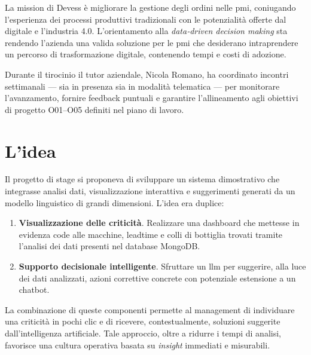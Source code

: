 La mission di Devess è migliorare la gestione degli ordini nelle \gls{pmi}, coniugando l’esperienza dei processi produttivi tradizionali con le potenzialità offerte 
dal digitale e l'industria 4.0. L’orientamento alla \textit{data‑driven decision making} sta rendendo 
l’azienda una valida soluzione per le \gls{pmi} che desiderano intraprendere un percorso di trasformazione digitale, contenendo tempi e costi di adozione.

Durante il tirocinio il tutor aziendale, Nicola Romano, ha coordinato incontri settimanali — sia in presenza sia in modalità telematica — per monitorare l’avanzamento, fornire 
feedback puntuali e garantire l’allineamento agli obiettivi di progetto O01–O05 definiti nel piano di lavoro.

\section{L'idea}
Il progetto di stage si proponeva di sviluppare un sistema dimostrativo che integrasse analisi dati, visualizzazione interattiva e suggerimenti generati da un modello linguistico 
di grandi dimensioni. L’idea era duplice:
\begin{enumerate}
\item \textbf{Visualizzazione delle criticità}. Realizzare una dashboard che mettesse in evidenza code alle macchine, \gls{leadtime} e colli di bottiglia trovati tramite l'analisi dei dati presenti nel database MongoDB.
\item \textbf{Supporto decisionale intelligente}. Sfruttare un \gls{llm} per suggerire, alla luce dei dati analizzati, azioni correttive concrete con potenziale estensione a un chatbot.
\end{enumerate}

La combinazione di queste componenti permette al management di individuare una criticità in pochi clic e di ricevere, contestualmente, soluzioni suggerite dall’intelligenza artificiale. Tale approccio, oltre a ridurre i tempi di analisi, favorisce una cultura operativa basata su \textit{insight} immediati e misurabili.



